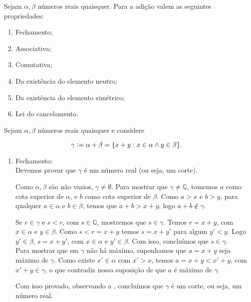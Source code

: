 \documentclass[../main.tex]{subfiles}
\begin{document}
\begin{teo}\label{reais-teo-somaPropriedades}{Sejam $\alpha, \beta$ números reais quaisquer. Para a adição valem as seguintes propriedades:}
    \begin{enumerate}[label=(\roman*)]
        \item Fechamento;
        \item Associativa;
        \item Comutativa;
        \item Da existência do elemento neutro; 
        \item Da existência do elemento simétrico;
        \item Lei do cancelamento.
    \end{enumerate}
\end{teo}
\begin{dem}
    Sejam $\alpha, \beta$ números reais quaisquer e considere 
    
    \[ \gamma \vcentcolon= \alpha + \beta = \{ x + y : x \in \alpha \land y \in \beta \} . \]
    \begin{enumerate}[label=(\roman*)]
        \item Fechamento: \\
            Devemos provar que $\gamma$ é um número real (ou seja, um corte). 
            
            Como $\alpha, \beta$ são não vazios, $\gamma \neq \emptyset$. Para mostrar que $\gamma \neq \mathbb{Q}$, tomemos $a$ como cota superior de $\alpha$, e $b$ como cota superior de $\beta$. Como $a > x$ e $b > y$, para qualquer $a \in \alpha$ e $b \in \beta$, temos que $a + b > x + y$, logo $a+b \not\in \gamma$. 

            
            Se $r \in \gamma$ e $s < r$, com $s \in \mathbb{Q}$, mostremos que $s \in \gamma$. Temos $r = x + y$, com $x \in \alpha$ e $y \in \beta$.
            Como $s < r = x + y$ temos $s = x + y'$ para algum $y' < y$. Logo $y' \in \beta$, $s = x + y'$, com $x \in \alpha$ e $y' \in \beta$. Com isso, concluímos que $s \in \gamma$. \\

            Para mostrar que em $\gamma$ não há máximo, suponhamos que $a = x + y$ seja máximo de $\gamma$. Como existe $x' \in \alpha$ com $x' > x$, temos $a = x + y < x' + y$, com $x'+y \in \gamma$, o que contradiz nossa suposição de que $a$ é máximo de $\gamma$.

            Com isso provado, observando a , concluímos que $\gamma$ é um corte, ou seja, um número real.
        

\end{enumerate}
\end{dem}
\end{document}
